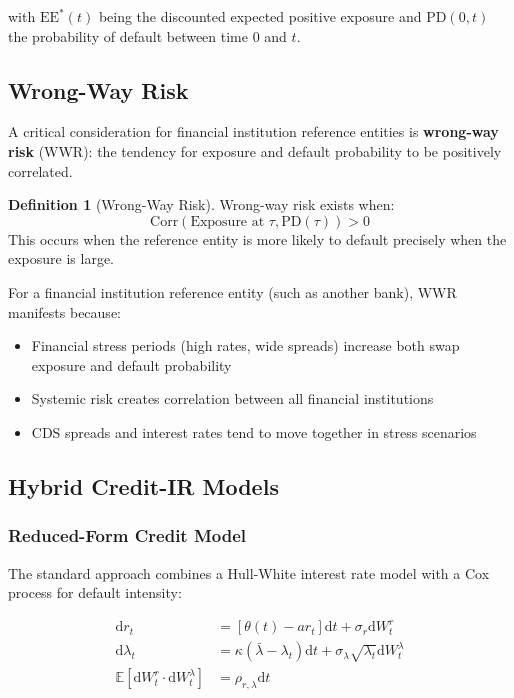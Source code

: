 \documentclass[11pt,a4paper]{article}
\theoremstyle{definition}
\newtheorem{definition}{Definition}[section]
\newcommand{\E}{\mathbb{E}}
\newcommand{\diff}{\mathrm{d}}
\newcommand{\PD}{\mathrm{PD}}
\newcommand{\EE}{\mathrm{EE}}
\begin{document}
with $\EE^*(t)$ being the discounted expected positive exposure and $\PD(0,t)$ the probability of default between time 0 and $t$.

\subsection{Wrong-Way Risk}

A critical consideration for financial institution reference entities is \textbf{wrong-way risk} (WWR): the tendency for exposure and default probability to be positively correlated.

\begin{definition}[Wrong-Way Risk]
Wrong-way risk exists when:
\begin{equation}
\text{Corr}(\text{Exposure at } \tau, \PD(\tau)) > 0
\end{equation}
This occurs when the reference entity is more likely to default precisely when the exposure is large.
\end{definition}

For a financial institution reference entity (such as another bank), WWR manifests because:
\begin{itemize}
    \item Financial stress periods (high rates, wide spreads) increase both swap exposure and default probability
    \item Systemic risk creates correlation between all financial institutions
    \item CDS spreads and interest rates tend to move together in stress scenarios
\end{itemize}

\subsection{Hybrid Credit-IR Models}

\subsubsection{Reduced-Form Credit Model}

The standard approach combines a Hull-White interest rate model with a Cox process for default intensity:

\begin{align}
\diff r_t &= [\theta(t) - a r_t] \diff t + \sigma_r \diff W^r_t \\
\diff \lambda_t &= \kappa(\bar{\lambda} - \lambda_t) \diff t + \sigma_\lambda \sqrt{\lambda_t} \diff W^\lambda_t \\
\E[\diff W^r_t \cdot \diff W^\lambda_t] &= \rho_{r,\lambda} \diff t
\end{align}
\end{document}
